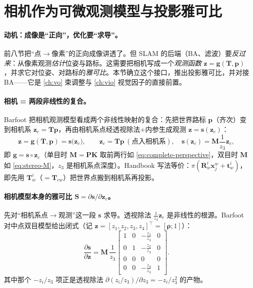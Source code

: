 \section{相机作为可微观测模型与投影雅可比}
\label{sec:cam-obs}

\paragraph{动机：成像是“正向”，优化要“求导”。}
前八节把“点$\to$像素”的正向成像讲透了。但 SLAM 的后端（BA、滤波）要\emph{反过来}：从像素观测\emph{估计}位姿与路标。这需要把相机写成一个\emph{观测函数} $\mathbf{z}=\mathbf{g}(\mathbf{T},\mathbf{p})$，并求它对位姿、对路标的\emph{雅可比}\cite{barfoot2024state,carlone2026handbook}。本节确立这个接口，推出投影雅可比，并对接 BA——它是 \cref{ch:vo} 束调整与 \cref{ch:vio} 视觉因子的直接前置。

\paragraph{相机 = 两段非线性的复合。}
Barfoot\cite{barfoot2024state} 把相机观测模型看成两个非线性映射的复合：先把世界路标 $\mathbf{p}$（齐次）变到相机系 $\mathbf{z}_c=\mathbf{T}\mathbf{p}$，再由相机系点经透视除法$+$内参生成观测 $\mathbf{z}=\mathbf{s}(\mathbf{z}_c)$：
\begin{equation}
  \mathbf{z}=\mathbf{g}(\mathbf{T},\mathbf{p})=\mathbf{s}\big(\mathbf{z}_c\big),\qquad
  \mathbf{z}_c=\mathbf{T}\mathbf{p}\ (\text{点入相机系}),\quad
  \mathbf{s}(\mathbf{z}_c)=\mathbf{M}\frac{1}{z_3}\mathbf{z}_c,
  \label{eq:obs-composition}
\end{equation}
即 $\mathbf{g}=\mathbf{s}\circ\mathbf{z}_c$（单目时 $\mathbf{M}=\mathbf{P}\mathbf{K}$ 取前两行如 \cref{eq:complete-perspective}，双目时 $\mathbf{M}$ 如 \cref{eq:stereo-M}，$z_3$ 是相机系点深度）。Handbook\cite{carlone2026handbook} 写法等价：$\pi(\mathbf{R}_w^i\mathbf{x}_j^w+\mathbf{t}_w^i)$，即先用 $\mathbf{T}_w^i$（$=\mathbf{T}_{cw}$）把世界点搬到相机系再投影。

\paragraph{相机模型本身的雅可比 $\mathbf{S}=\partial\mathbf{s}/\partial\mathbf{z}_c$。}
先对“相机系点$\to$观测”这一段 $\mathbf{s}$ 求导。透视除法 $\tfrac1{z_3}\mathbf{z}_c$ 是非线性的根源。Barfoot 对中点双目模型给出闭式\cite{barfoot2024state}（记 $\mathbf{z}=[z_1,z_2,z_3,z_4]^\top=[\boldsymbol\rho;1]$）：
\begin{equation}
  \frac{\partial\mathbf{s}}{\partial\mathbf{z}}=\mathbf{M}\,\frac1{z_3}
  \begin{bmatrix}1&0&-\tfrac{z_1}{z_3}&0\\0&1&-\tfrac{z_2}{z_3}&0\\0&0&0&0\\0&0&-\tfrac{z_4}{z_3}&1\end{bmatrix}.
  \label{eq:jac-S}
\end{equation}
其中那个 $-z_i/z_3$ 项正是透视除法 $\partial(z_i/z_3)/\partial z_3=-z_i/z_3^2$ 的产物。

